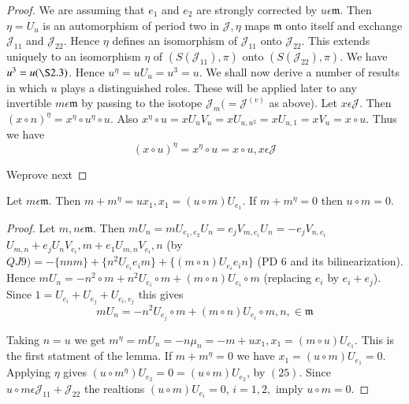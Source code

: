 \begin{proof}
We are assuming that $e_1$ and $e_2$ are strongly
corrected by $u\epsilon \mathfrak{m}$. Then $\eta=U_u$ is an
automorphism of period two in $\mathscr{J},\eta$ maps $\mathfrak{m}$
onto itself and exchange $\mathscr{J}_{11}$ and
$\mathscr{J}_{22}$. Hence $\eta$ defines an isomorphism of
$\mathscr{J}_{11}$ onto $\mathscr{J}_{22}$. This extends uniquely to
an isomorphism $\eta$ of $(S(\mathscr{J}_{11}),\pi)$ onto
$(S(\mathscr{J}_{22}),\pi)$. We have $u^{3}=u(\S 2.3)$. Hence
$u^{\eta}=uU_u=u^{3}=u$. We shall now derive a number of results in
which $u$ plays a distinguished roles. These will be applied later to
any invertible $m\epsilon \mathfrak{m}$ by passing to the isotope
$\mathscr{J}_m(=\mathscr{J}^{(v)}$ as above). Let $x\epsilon
\mathscr{J}$. Then $(x\circ n)^{\eta}=x^{\eta}\circ u^{\eta}\circ
u$. Also $x^{\eta}\circ u=xU_uV_u=xU_{u,u^{2}}=xU_{u,1}=xV_u=x\circ
u$. Thus we have
\begin{equation*}
  (x\circ u)^{\eta}=x^{\eta}\circ u=x\circ u, x\epsilon
  \mathscr{J}\tag{25}\label{c3:eq25} 
\end{equation*}

We\pageoriginale prove next
\end{proof}

\begin{lemma}\label{c3:sec9:lem2}
Let $m\epsilon \mathfrak{m}$. Then $m+m^{\eta}=ux_1,x_1=(u\circ
m)U_{e_1}$. If $m+m^{\eta}=0$ then $u\circ m=0$.
\end{lemma}

\begin{proof}
Let $m,n\epsilon \mathfrak{m}$. Then
$mU_n=mU_{e_1,e_2}U_n=e_jV_{m,e_i}U_n=-e_jV_{n,e_i}$ $U_{m,n}+e_jU_nV_{e_i},m+e_1U_{m,n}V_{e_{i}},n$
(by $QJ 9)=-\{nnm\}+\{n^{2}U_{e_i}e_im\}+\{(m\circ n)U_{e_i}e_in\}$
(PD $6$ and its bilinearization). Hence $mU_n=-n^{2}\circ
m+n^{2}U_{e_i}\circ m+(m\circ n)U_{e_i}\circ m$ (replacing $e_i$ by
$e_i+e_j$). Since $1=U_{e_i}+U_{e_j}+U_{e_i,e_j}$ this gives
\begin{equation*}
  mU_n=-n^{2}U_{e_j}\circ m+(m\circ n)U_{e_i}\circ m, n, \in
  \mathfrak{m}\tag{26}\label{c3:eq26}  
\end{equation*}

Taking $n=u$ we get $m^{\eta}=mU_n=-n\mu_n=-m+ux_1,x_1=(m\circ
u)U_{e_1}$. This is the first statment of the lemma. If $m+m^{\eta}=0$
we have $x_1=(u\circ m)U_{e_1}=0$. Applying $\eta$ gives $(u\circ
m^{\eta})U_{e_2}=0=(u\circ m)U_{e_2}$, by $(25)$. Since $u\circ
m\epsilon \mathscr{J}_{11}+\mathscr{J}_{22}$ the realtions $(u\circ
m)U_{e_i}=0$, $i=1,2,$ imply $u\circ m=0$.
\end{proof}

